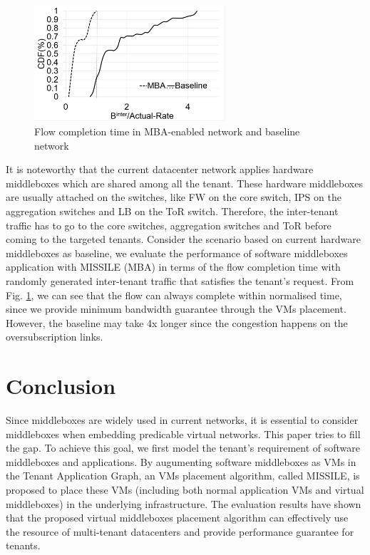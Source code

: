 \documentclass[10pt, conference, letterpaper]{IEEEtran}
\begin{document}
\begin{figure}
\center
		\includegraphics[width=2.8in]{fig/sim.pdf}
	\caption{Flow completion time in MBA-enabled network and baseline network}
	\label{fig:wang}
\end{figure}

It is noteworthy that the current datacenter network applies hardware middleboxes which are shared among all the tenant. These hardware middleboxes are usually attached on the switches, like FW on the core switch, IPS on the aggregation switches and LB on the ToR switch. Therefore, the inter-tenant traffic has to go to the core switches, aggregation switches and ToR before coming to the targeted tenants. Consider the scenario based on current hardware middleboxes as baseline, we evaluate the performance of software middleboxes application with MISSILE (MBA) in terms of the flow completion time with randomly generated inter-tenant traffic that satisfies the tenant's request. From Fig. \ref{fig:wang}, we can see that the flow can always complete within normalised time, since we provide minimum bandwidth guarantee through the VMs placement. However, the baseline may take 4x longer since the congestion happens on the oversubscription links. 

\section{Conclusion}\label{sec:final}
Since middleboxes are widely used in current networks, it is essential to consider middleboxes when embedding predicable virtual networks. This paper tries to fill the gap. To achieve this goal, we first model the tenant's requirement of software middleboxes and applications. By augumenting software middleboxes as VMs in the Tenant Application Graph, an VMs placement algorithm, called MISSILE, is proposed to place these VMs (including both normal application VMs and virtual middleboxes) in the underlying infrastructure. The evaluation results have shown that the proposed virtual middleboxes placement algorithm can effectively use the resource of multi-tenant datacenters and provide performance guarantee for tenants.   
\end{document}
